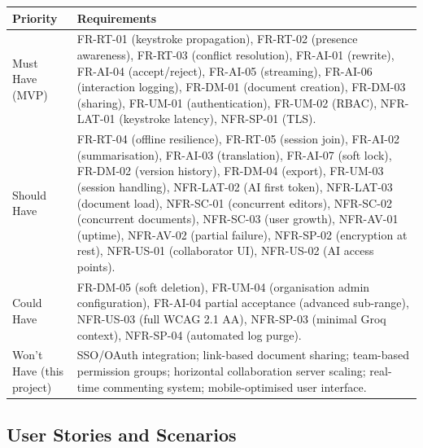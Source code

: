 \documentclass{article}
\begin{document}
\noindent
{\small
\begin{tabularx}{\textwidth}{|>{\hsize=0.5\hsize\raggedright\arraybackslash}X|>{\hsize=1.5\hsize\raggedright\arraybackslash}X|}
    \hline
    \rowcolor{tableBlue} 
    \textbf{\color{white}Priority} & 
    \textbf{\color{white}Requirements} \\
    \hline
    Must Have (MVP) &
    FR-RT-01 (keystroke propagation), FR-RT-02 (presence awareness), FR-RT-03 (conflict resolution), FR-AI-01 (rewrite), FR-AI-04 (accept/reject), FR-AI-05 (streaming), FR-AI-06 (interaction logging), FR-DM-01 (document creation), FR-DM-03 (sharing), FR-UM-01 (authentication), FR-UM-02 (RBAC), NFR-LAT-01 (keystroke latency), NFR-SP-01 (TLS). \\
    \hline
    Should Have &
    FR-RT-04 (offline resilience), FR-RT-05 (session join), FR-AI-02 (summarisation), FR-AI-03 (translation), FR-AI-07 (soft lock), FR-DM-02 (version history), FR-DM-04 (export), FR-UM-03 (session handling), NFR-LAT-02 (AI first token), NFR-LAT-03 (document load), NFR-SC-01 (concurrent editors), NFR-SC-02 (concurrent documents), NFR-SC-03 (user growth), NFR-AV-01 (uptime), NFR-AV-02 (partial failure), NFR-SP-02 (encryption at rest), NFR-US-01 (collaborator UI), NFR-US-02 (AI access points). \\
    \hline
    Could Have &
    FR-DM-05 (soft deletion), FR-UM-04 (organisation admin configuration), FR-AI-04 partial acceptance (advanced sub-range), NFR-US-03 (full WCAG 2.1 AA), NFR-SP-03 (minimal Groq context), NFR-SP-04 (automated log purge). \\
    \hline
    Won't Have \newline (this project) &
    SSO/OAuth integration; link-based document sharing; team-based permission groups; horizontal collaboration server scaling; real-time commenting system; mobile-optimised user interface. \\
    \hline
\end{tabularx}
}








\subsection{User Stories and Scenarios}
\vspace{5pt}
\end{document}
